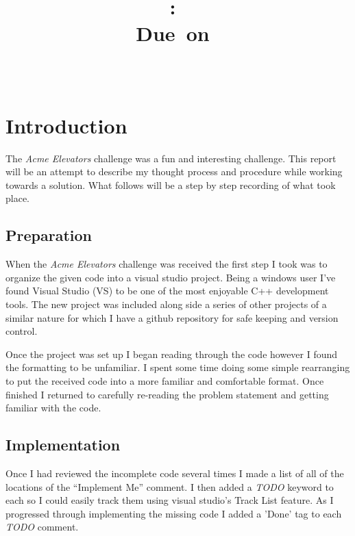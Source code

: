 \documentclass{article}
\title{
\vspace{2in}
\textmd{\textbf{\hmwkClass:\ \hmwkTitle}}\\
\normalsize\vspace{0.1in}\small{Due\ on\ \hmwkDueDate}\\
\vspace{0.1in}\large{\textit{\hmwkClassInstructor\ \hmwkClassTime}}
\vspace{3in}
}
\author{\textbf{\hmwkAuthorName}}
\date{} %
\begin{document}
\maketitle



\newpage

\section{Introduction}
The \textit{Acme Elevators} challenge was a fun and interesting challenge. 
This report will be an attempt to describe my thought process and procedure while working towards a solution.
What follows will be a step by step recording of what took place.

\subsection{Preparation}
When the \textit{Acme Elevators} challenge was received the first step I took was to organize the given code into a visual studio project.
Being a windows user I've found Visual Studio (VS) to be one of the most enjoyable C++ development tools.
The new project was included along side a series of other projects of a similar nature for which I have a github repository for safe keeping and version control.\newline

Once the project was set up I began reading through the code however I found the formatting to be unfamiliar.
I spent some time doing some simple rearranging to put the received code into a more familiar and comfortable format.
Once finished I returned to carefully re-reading the problem statement and getting familiar with the code. 

\subsection{Implementation}
Once I had reviewed the incomplete code several times I made a list of all of the locations of the ``Implement Me'' comment.
I then added a \textit{TODO} keyword to each so I could easily track them using visual studio's Track List feature.
As I progressed through implementing the missing code I added a 'Done' tag to each \textit{TODO} comment.
\end{document}
